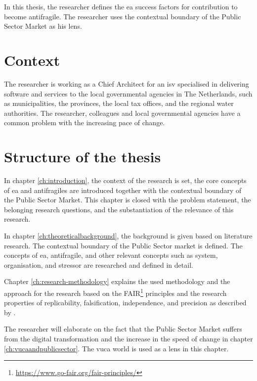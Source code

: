 In this thesis, the researcher defines the \acrfull{ea} success factors for contribution to become \gls{antifragile}. The researcher uses the contextual boundary of the Public Sector Market as his lens.

\section{Context}
\label{sec:context}
The researcher is working as a Chief Architect for an \acrfull{isv} specialised in delivering software and services to the local governmental agencies in The Netherlands, such as municipalities, the provinces, the local tax offices, and the regional water authorities. The researcher, colleagues and local governmental agencies have a common problem with the increasing pace of change.

\section{Structure of the thesis}
\label{sec:structure}
In chapter \ref{ch:introduction}, the context of the research is set, the core concepts of \acrshort{ea} and \glspl{antifragile} are introduced together with the contextual boundary of the Public Sector Market. This chapter is closed with the problem statement, the belonging research questions, and the substantiation of the relevance of this research.

In chapter \ref{ch:theoreticalbackground}, the background is given based on literature research. The contextual boundary of the Public Sector market is defined. The concepts of \acrshort{ea}, \gls{antifragile}, and other relevant concepts such as system, organisation, and stressor are researched and defined in detail. 

Chapter \ref{ch:research-methodology} explains the used methodology and the approach for the research based on the FAIR\footnote{\url{https://www.go-fair.org/fair-principles/}} principles and the research properties of replicability, falsification, independence, and precision as described by \textcite{Recker2013}.

The researcher will elaborate on the fact that the Public Sector Market suffers from the digital transformation and the increase in the speed of change in chapter \ref{ch:vucaandpublicsector}. The \acrfull{vuca} world \parencite{Bennett2014} is used as a lens in this chapter.

